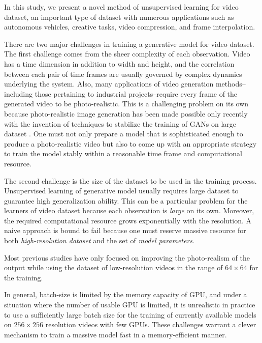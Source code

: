\documentclass[twocolumn]{svjour3}
\begin{document}
In this study, we present a novel method of unsupervised learning for video dataset, an important type of dataset with numerous applications such as autonomous vehicles, creative tasks, video compression, and frame interpolation.







There are two major challenges in training a generative model for video dataset.
The first challenge comes from the sheer complexity of each observation.
Video has a time dimension in addition to width and height, and the correlation between each pair of time frames are usually governed by complex dynamics underlying the system.
Also, many applications of video generation methods--including those pertaining to industrial projects--require every frame of the generated video to be photo-realistic.
This is a challenging problem on its own because photo-realistic image generation has been made possible only recently with the invention of techniques to stabilize the training of GANs on large dataset \cite{Karras2018,Miyato2018,Mescheder2018}.
One must not only prepare a model that is sophisticated enough to produce a photo-realistic video but also to come up with an appropriate strategy to train the model stably within a reasonable time frame and computational resource.




The second challenge is the size of the dataset to be used in the training process.
Unsupervised learning of generative model usually requires large dataset to guarantee high generalization ability.
This can be a particular problem for the learners of video dataset because each observation is \textit{large} on its own.
Moreover, the required computational resource grows exponentially with the resolution.
A naive approach is bound to fail because one must reserve massive resource for both \textit{high-resolution dataset} and the set of \textit{model parameters}.











Most previous studies have only focused on improving the photo-realism of the output \cite{Vondrick2016,Saito2017,Tulyakov2018} while using the dataset of low-resolution videos in the range of $64 \times 64$ for the training.


In general, batch-size is limited by the memory capacity of GPU, and under a situation where the number of usable GPU is limited, it is unrealistic in practice to use a sufficiently large batch size for the training of currently available models on $256 \times 256$ resolution videos with few GPUs.
These challenges warrant a clever mechanism to train a massive model fast in a memory-efficient manner.
\end{document}
